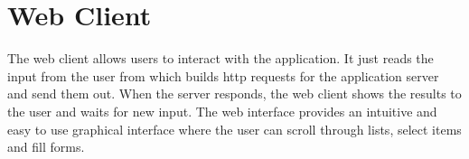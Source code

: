 \section{Web Client}\label{sec:web_client}

The web client allows users to interact with the application. It just reads the
input from the user from which builds http requests for the application server
and send them out. When the server responds, the web client shows the results to
the user and waits for new input. The web interface provides an intuitive and
easy to use graphical interface where the user can scroll through lists, select
items and fill forms.
